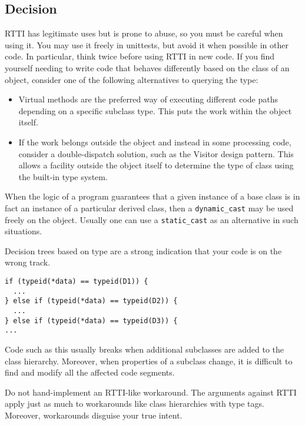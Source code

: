 \subsection{Decision}
RTTI has legitimate uses but is prone to abuse, so you must be careful when using it. You may use it freely in unittests, but avoid it when possible in other code. In particular, think twice before using RTTI in new code. If you find yourself needing to write code that behaves differently based on the class of an object, consider one of the following alternatives to querying the type:
\begin{itemize}
    \item Virtual methods are the preferred way of executing different code paths depending on a specific subclass type. This puts the work within the object itself.
    \item If the work belongs outside the object and instead in some processing code, consider a double-dispatch solution, such as the Visitor design pattern. This allows a facility outside the object itself to determine the type of class using the built-in type system.
\end{itemize}

When the logic of a program guarantees that a given instance of a base class is in fact an instance of a particular derived class, then a \texttt{dynamic_cast} may be used freely on the object. Usually one can use a \texttt{static_cast} as an alternative in such situations.

Decision trees based on type are a strong indication that your code is on the wrong track.
\begin{verbatim}
if (typeid(*data) == typeid(D1)) {
  ...
} else if (typeid(*data) == typeid(D2)) {
  ...
} else if (typeid(*data) == typeid(D3)) {
...
\end{verbatim}

Code such as this usually breaks when additional subclasses are added to the class hierarchy. Moreover, when properties of a subclass change, it is difficult to find and modify all the affected code segments.

Do not hand-implement an RTTI-like workaround. The arguments against RTTI apply just as much to workarounds like class hierarchies with type tags. Moreover, workarounds disguise your true intent.
